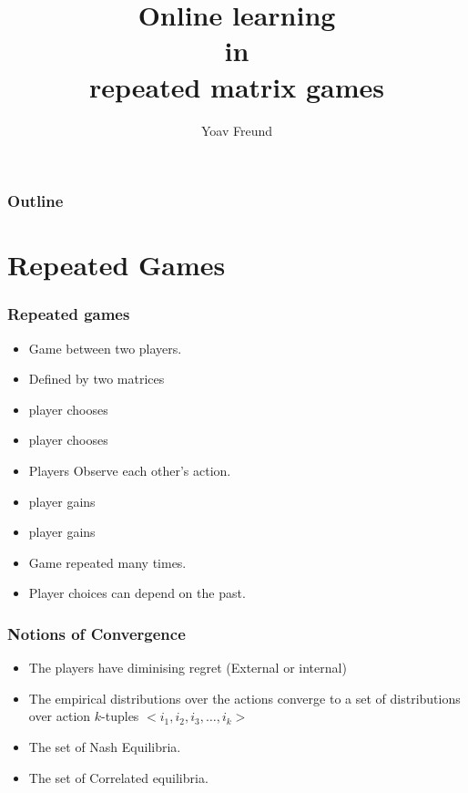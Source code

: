 \documentclass{beamer}
\title [Learning in repeated games] %
{Online learning \\ in \\ repeated matrix games}
\author[Freund] %
{Yoav Freund}
\institute[Universities of Somewhere and Elsewhere] %
\begin{document}
%

\begin{frame}
  \titlepage
\end{frame}

\begin{frame}
  \frametitle{Outline}
  \tableofcontents[pausesections]
\end{frame}

\section{Repeated Games}

\begin{frame}
\frametitle{Repeated games}
\begin{itemize}
\item Game between two players.
\item Defined by two  matrices \R{$\R,\C$}
\item {} player chooses 
\item {} player chooses 
\item Players Observe each other's action.
\item {} player gains 
\item {} player gains 
\item Game repeated many times.
\item Player choices can depend on the past.
\end{itemize}
\end{frame}

\begin{frame}
\frametitle{Notions of Convergence}
\begin{itemize}
\item {} The players have diminising regret (External or internal) 
\item {} The empirical distributions over the actions converge to a
  set of distributions over action $k$-tuples $<i_1,i_2,i_3,\ldots,i_k>$
\item The set of Nash Equilibria.
\item The set of Correlated equilibria.
\end{itemize}
\end{frame}
\end{document}
